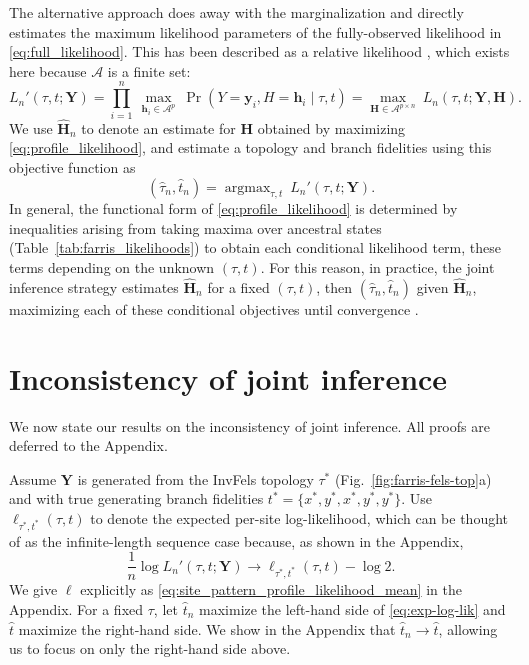 \documentclass[11pt]{article}
\newcommand{\alphabet}{\mathcal{A}}
\newcommand{\fullAlignment}{\mathbf{Y}}
\newcommand{\alignmentColumn}{\mathbf{y}}
\newcommand{\alignmentColumnRV}{Y}
\newcommand{\fullAncestralStates}{\mathbf{H}}
\newcommand{\ancestralStateColumn}{\mathbf{h}}
\newcommand{\ancestralStateColumnRV}{H}
\newcommand{\nCols}{n}
\newcommand{\nAncestralStateRows}{p}
\DeclareMathOperator*{\argmax}{argmax}
\begin{document}
The alternative approach \citep{Sagulenko2018-xl} does away with the marginalization and directly estimates the maximum likelihood parameters of the fully-observed likelihood in \eqref{eq:full_likelihood}.
This has been described as a relative likelihood \citep{Goldman1990-dk}, which exists here because $\alphabet$ is a finite set:
\begin{equation}
\label{eq:profile_likelihood}
L_\nCols'(\tau, t; \fullAlignment) = \prod_{i=1}^{\nCols} \ \max_{\ancestralStateColumn_i\in\alphabet^{\nAncestralStateRows}} \ \Pr(\alignmentColumnRV=\alignmentColumn_i, \ancestralStateColumnRV=\ancestralStateColumn_i \mid \tau, t) = \max_{\fullAncestralStates\in\alphabet^{\nAncestralStateRows\times\nCols}} \ L_\nCols(\tau, t; \fullAlignment, \fullAncestralStates).
\end{equation}
We use $\hat{\fullAncestralStates}_\nCols$ to denote an estimate for $\fullAncestralStates$ obtained by maximizing \eqref{eq:profile_likelihood}, and estimate a topology and branch fidelities using this objective function as
\begin{equation}
\label{eq:profile_likelihood_topology_bl}
(\hat{\tau}_\nCols, \hat{t}_\nCols) = \argmax_{\tau, t} \ L_\nCols'(\tau, t; \fullAlignment).
\end{equation}
In general, the functional form of \eqref{eq:profile_likelihood} is determined by inequalities arising from taking maxima over ancestral states (Table~\ref{tab:farris_likelihoods}) to obtain each conditional likelihood term, these terms depending on the unknown $(\tau, t)$.
For this reason, in practice, the joint inference strategy estimates $\hat{\fullAncestralStates}_\nCols$ for a fixed $(\tau,t)$, then $(\hat{\tau}_\nCols,\hat{t}_\nCols)$ given $\hat{\fullAncestralStates}_\nCols$, maximizing each of these conditional objectives until convergence \citep{Sagulenko2018-xl}.


\section*{Inconsistency of joint inference}

We now state our results on the inconsistency of joint inference.
All proofs are deferred to the Appendix.

Assume $\fullAlignment$ is generated from the InvFels topology $\tau^*$ (Fig.~\ref{fig:farris-fels-top}a) and with true generating branch fidelities $t^*=\{x^*, y^*, x^*, y^*, y^*\}$.
Use $\ell_{\tau^*,t^*}(\tau, t)$ to denote the expected per-site log-likelihood, which can be thought of as the infinite-length sequence case because, as shown in the Appendix,
\begin{equation}
\label{eq:exp-log-lik}
\frac{1}{n}\log L_\nCols'(\tau, t; \fullAlignment) \rightarrow \ell_{\tau^*,t^*}(\tau, t) - \log 2.
\end{equation}
We give $\ell$ explicitly as \eqref{eq:site_pattern_profile_likelihood_mean} in the Appendix.
For a fixed $\tau$, let $\hat{t}_\nCols$ maximize the left-hand side of \eqref{eq:exp-log-lik} and $\hat{t}$ maximize the right-hand side.
We show in the Appendix that $\hat{t}_\nCols \rightarrow \hat{t}$, allowing us to focus on only the right-hand side above.
\end{document}
